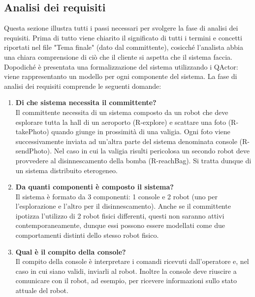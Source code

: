 \subsection{Analisi dei requisiti}
Questa sezione illustra tutti i passi necessari per svolgere la fase di analisi dei requisiti. Prima di tutto viene chiarito il significato di tutti i termini e concetti riportati nel file "Tema finale" (dato dal committente), cosicché l'analista abbia una chiara comprensione di ciò che il cliente si aspetta che il sistema faccia. Dopodiché è presentata una formalizzazione del sistema utilizzando i QActor: viene rappresentanto un modello per ogni componente del sistema.
La fase di analisi dei requisiti comprende le seguenti domande:

\begin{enumerate}

    \item  \textbf{Di che sistema necessita il committente?} \\
Il committente necessita di un sistema composto da un robot che deve esplorare tutta la hall di un aeroporto (R-explore) e scattare una foto (R-takePhoto) quando giunge in prossimità di una valigia. Ogni foto viene successivamente inviata ad un'altra parte del sistema denominata console (R-sendPhoto). Nel caso in cui la valigia risulti pericolosa un secondo robot deve provvedere al disinnescamento della bomba (R-reachBag).
Si tratta dunque di un sistema distribuito eterogeneo.

\item  \textbf{Da quanti componenti è composto il sistema?}\\
Il sistema è formato da 3 componenti: 1 console e 2 robot (uno per l'esplorazione e l'altro per il disinnescamento). Anche se il committente ipotizza l'utilizzo di 2 robot fisici differenti, questi non saranno attivi contemporaneamente, dunque essi possono essere modellati come due comportamenti distinti dello stesso robot fisico.

\item  \textbf{Qual è il compito della console?}\\
Il compito della console è interpretare i comandi ricevuti dall'operatore e, nel caso in cui siano validi, inviarli al robot. Inoltre la console deve riuscire a comunicare con il robot, ad esempio, per ricevere informazioni sullo stato attuale del robot.


\end{enumerate}
